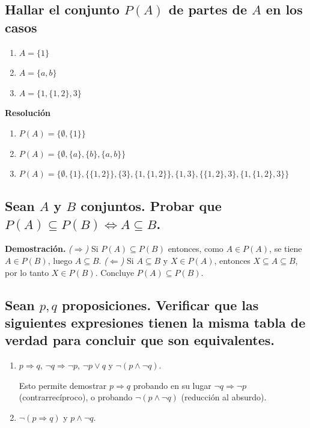 \documentclass[11pt]{article}
\begin{document}
\subsection{Hallar el conjunto \(P(A)\) de partes de \(A\) en los casos}
\begin{multicols}{3}
    \begin{enumerate}[label=\roman*)]
        \item \(A = \{1\}\)
        \item \( A = \{a, b\}\)
        \item \(A = \{1, \{1, 2\}, 3\}\)
    \end{enumerate}
\end{multicols}

\textbf{Resolución}

\begin{enumerate}[label=\roman*)]
    \item \(P(A) = \{\emptyset, \{1\}\}\)
    \item \(P(A) = \{\emptyset, \{a\}, \{b\}, \{a, b\}\}\)
    \item \(P(A) = \{\emptyset, \{1\}, \{\{1,2\}\}, \{3\}, \{1, \{1,2\}\}, \{1, 3\}, \{\{1,2\}, 3\}, \{1, \{1,2\}, 3\}\}\)
\end{enumerate}

\subsection{Sean \(A\) y \(B\) conjuntos. Probar que \(P(A) \subseteq P(B) \Leftrightarrow A \subseteq B\).}

\textbf{Demostración.}
\emph{(\(\Rightarrow\))} Si \(P(A)\subseteq P(B)\) entonces, como \(A\in P(A)\), se tiene \(A\in P(B)\), luego \(A\subseteq B\).
\emph{(\(\Leftarrow\))} Si \(A\subseteq B\) y \(X\in P(A)\), entonces \(X\subseteq A\subseteq B\), por lo tanto \(X\in P(B)\). Concluye \(P(A)\subseteq P(B)\).

\subsection{Sean \(p, q\) proposiciones. Verificar que las siguientes expresiones tienen la misma tabla de verdad para concluir que son equivalentes.}

\begin{enumerate}[label=\roman*)]
\item \(p \Rightarrow q\), \quad \(\neg q \Rightarrow \neg p\), \quad \(\neg p \lor q\) \quad y \quad \(\neg (p \land \neg q)\).

Esto permite demostrar \(p \Rightarrow q\) probando en su lugar 
\(\neg q \Rightarrow \neg p\) (contrarrecíproco), 
o probando \(\neg (p \land \neg q)\) (reducción al absurdo).

\item \(\neg (p \Rightarrow q)\) \quad y \quad \(p \land \neg q\).
\end{enumerate}
\end{document}
